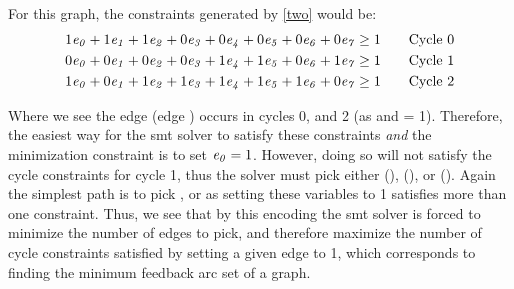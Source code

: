 %
For this graph, the constraints generated by \autoref{two} would be:
%
\begin{align*}
  1\mathit{e_{0}} + 1\mathit{e_{1}} + 1\mathit{e_{2}} + 0\mathit{e_{3}} + 0\mathit{e_{4}} + 0\mathit{e_{5}} + 0\mathit{e_{6}} + 0\mathit{e_{7}} \ge 1 & \qquad \text{Cycle 0} \\
  0\mathit{e_{0}} + 0\mathit{e_{1}} + 0\mathit{e_{2}} + 0\mathit{e_{3}} + 1\mathit{e_{4}} + 1\mathit{e_{5}} + 0\mathit{e_{6}} + 1\mathit{e_{7}} \ge 1 & \qquad \text{Cycle 1} \\
  1\mathit{e_{0}} + 0\mathit{e_{1}} + 1\mathit{e_{2}} + 1\mathit{e_{3}} + 1\mathit{e_{4}} + 1\mathit{e_{5}} + 1\mathit{e_{6}} + 0\mathit{e_{7}} \ge 1 & \qquad \text{Cycle 2}
\end{align*}

Where we see the edge  (edge ) occurs in cycles 0, and 2
(as  and  = 1). Therefore, the easiest way for the
\ac{smt} solver to satisfy these constraints \emph{and} the minimization
constraint is to set $\mathit{e_{0}} = 1$. However, doing so will not satisfy the
cycle constraints for cycle 1, thus the solver must pick either 
(),  (), or  (). Again
the simplest path is to pick , or  as setting these
variables to 1 satisfies more than one constraint. Thus, we see that by this
encoding the \ac{smt} solver is forced to minimize the number of edges to pick,
and therefore maximize the number of cycle constraints satisfied by setting a
given edge to 1, which corresponds to finding the minimum feedback arc set of a
graph.

